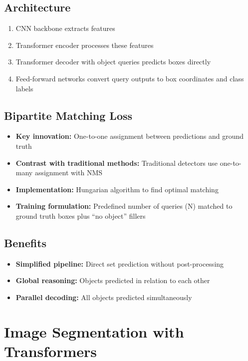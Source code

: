 \subsection*{Architecture}
\begin{enumerate}
    \item CNN backbone extracts features
    \item Transformer encoder processes these features
    \item Transformer decoder with object queries predicts boxes directly
    \item Feed-forward networks convert query outputs to box coordinates and class labels
\end{enumerate}

\subsection*{Bipartite Matching Loss}
\begin{itemize}
    \item \textbf{Key innovation:} One-to-one assignment between predictions and ground truth
    \item \textbf{Contrast with traditional methods:} Traditional detectors use one-to-many assignment with NMS
    \item \textbf{Implementation:} Hungarian algorithm to find optimal matching
    \item \textbf{Training formulation:} Predefined number of queries (N) matched to ground truth boxes plus ``no object'' fillers
\end{itemize}

\subsection*{Benefits}
\begin{itemize}
    \item \textbf{Simplified pipeline:} Direct set prediction without post-processing
    \item \textbf{Global reasoning:} Objects predicted in relation to each other
    \item \textbf{Parallel decoding:} All objects predicted simultaneously
\end{itemize}

\section{Image Segmentation with Transformers}

